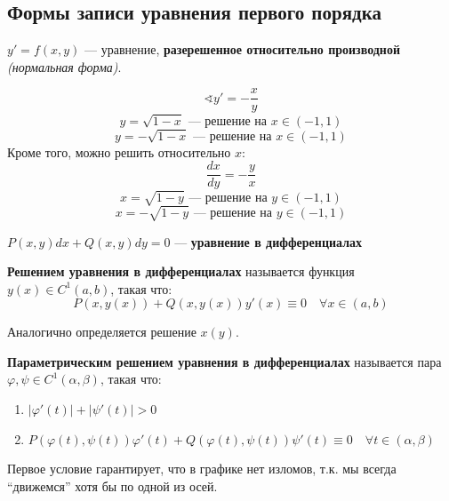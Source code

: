 \subsection{Формы записи уравнения первого порядка}

\begin{definition}
    $y'=f(x,y)$ --- уравнение, \textbf{разерешенное относительно производной} \textit{(нормальная форма)}.
\end{definition}

\begin{example}
    $$\sphericalangle y' = -\frac{x}{y}$$
    $$y = \sqrt{1 - x} \text{ --- решение на } x\in(-1, 1)$$
    $$y = -\sqrt{1 - x} \text{ --- решение на } x\in(-1, 1)$$
    Кроме того, можно решить относительно $x$:
    $$\frac{dx}{dy} = -\frac{y}{x}$$
    $$x = \sqrt{1 - y} \text{ --- решение на } y\in(-1, 1)$$
    $$x = -\sqrt{1 - y} \text{ --- решение на } y\in(-1, 1)$$
\end{example}

\begin{definition}
    $P(x, y)dx + Q(x, y)dy = 0$ --- \textbf{уравнение в дифференциалах}
\end{definition}

\begin{definition}
    \textbf{Решением уравнения в дифференциалах} называется функция $y(x)\in C^1(a,b)$, такая что:
    $$P(x, y(x)) + Q(x, y(x)) y'(x) \equiv 0 \quad \forall x\in(a,b)$$
\end{definition}

Аналогично определяется решение $x(y)$.

\begin{definition}
    \textbf{Параметрическим решением уравнения в дифференциалах} называется пара $\varphi, \psi \in C^1(\alpha, \beta)$, такая что:
    \begin{enumerate}
        \item $|\varphi'(t)| + |\psi'(t)| > 0$
        \item $P(\varphi(t), \psi(t))\varphi'(t) + Q(\varphi(t), \psi(t))\psi'(t) \equiv 0 \quad \forall t\in (\alpha, \beta)$
    \end{enumerate}
\end{definition}

\begin{remark}
    Первое условие гарантирует, что в графике нет изломов, т.к. мы всегда ``движемся'' хотя бы по одной из осей.
\end{remark}

